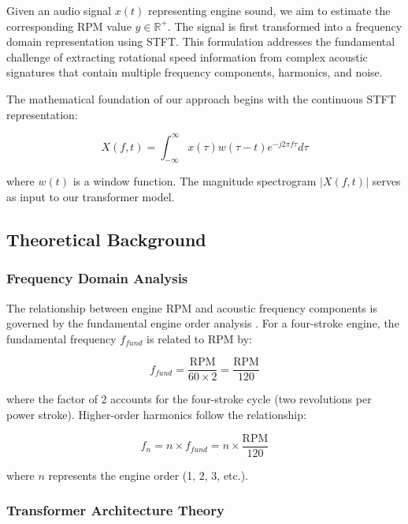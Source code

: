 \documentclass[journal,10pt]{IEEEtran}
\begin{document}
Given an audio signal $x(t)$ representing engine sound, we aim to estimate the corresponding RPM value $y \in \mathbb{R}^+$. The signal is first transformed into a frequency domain representation using STFT. This formulation addresses the fundamental challenge of extracting rotational speed information from complex acoustic signatures that contain multiple frequency components, harmonics, and noise.

The mathematical foundation of our approach begins with the continuous STFT representation:

\begin{equation}
X(f, t) = \int_{-\infty}^{\infty} x(\tau) w(\tau - t) e^{-j2\pi f\tau} d\tau
\end{equation}

where $w(t)$ is a window function. The magnitude spectrogram $|X(f, t)|$ serves as input to our transformer model.

\subsection{Theoretical Background}

\subsubsection{Frequency Domain Analysis}

The relationship between engine RPM and acoustic frequency components is governed by the fundamental engine order analysis \cite{non2}. For a four-stroke engine, the fundamental frequency $f_{fund}$ is related to RPM by:

\begin{equation}
f_{fund} = \frac{\text{RPM}}{60 \times 2} = \frac{\text{RPM}}{120}
\end{equation}

where the factor of 2 accounts for the four-stroke cycle (two revolutions per power stroke). Higher-order harmonics follow the relationship:

\begin{equation}
f_n = n \times f_{fund} = n \times \frac{\text{RPM}}{120}
\end{equation}

where $n$ represents the engine order (1, 2, 3, etc.).

\subsubsection{Transformer Architecture Theory}
\end{document}
